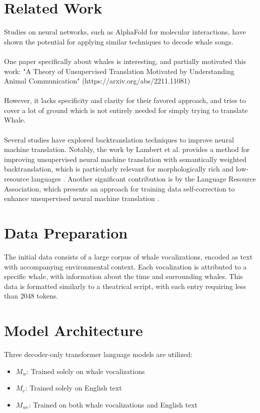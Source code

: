 \documentclass{article}
\begin{document}
\section{Related Work}
Studies on neural networks, such as AlphaFold for molecular interactions, have shown the potential for applying similar techniques to decode whale songs. \\ \\
One paper specifically about whales is interesting, and partially motivated this work:
"A Theory of Unsupervised Translation Motivated by Understanding Animal Communication" (https://arxiv.org/abs/2211.11081) \\ \\
However, it lacks specificity and clarity for their favored approach, and tries to cover a lot of ground which is not entirely needed for simply trying to translate Whale.\\ \\
Several studies have explored backtranslation techniques to improve neural machine translation. Notably, the work by Lambert et al. provides a method for improving unsupervised neural machine translation with semantically weighted backtranslation, which is particularly relevant for morphologically rich and low-resource languages \cite{backtranslation1}. Another significant contribution is by the Language Resource Association, which presents an approach for training data self-correction to enhance unsupervised neural machine translation \cite{backtranslation2}.


\section{Data Preparation}
The initial data consists of a large corpus of whale vocalizations, encoded as text with accompanying environmental context. Each vocalization is attributed to a specific whale, with information about the time and surrounding whales. This data is formatted similarly to a theatrical script, with each entry requiring less than 2048 tokens.

\section{Model Architecture}
Three decoder-only transformer language models are utilized:

\begin{itemize}
    \item $M_w$: Trained solely on whale vocalizations
    \item $M_e$: Trained solely on English text
    \item $M_{we}$: Trained on both whale vocalizations and English text
\end{itemize}
\end{document}
